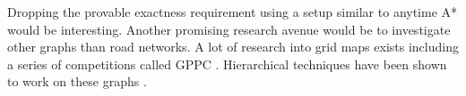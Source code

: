 \documentclass[letterpaper]{article} %
\begin{document}
Dropping the provable exactness requirement using a setup similar to anytime A* \cite{DBLP:conf/aaai/ZhouH02,DBLP:conf/nips/LikhachevGT03} would be interesting.
Another promising research avenue would be to investigate other graphs than road networks.
A lot of research into grid maps exists including a series of competitions called GPPC \cite{DBLP:conf/socs/SturtevantTTUKS15}.
Hierarchical techniques have been shown to work on these graphs \cite{DBLP:conf/aaai/UrasK14}.



\pagebreak



\end{document}
